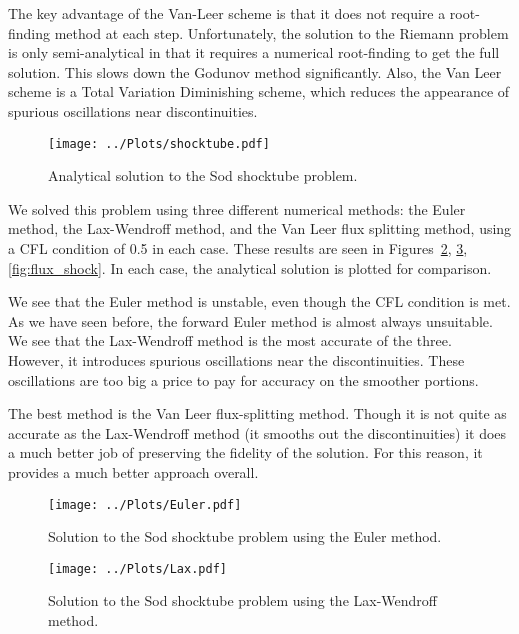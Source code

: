 \documentclass[twocolumn]{myarticle}
\begin{document}
The key advantage of the Van-Leer scheme is that it does not require a root-finding method at each step.
Unfortunately, the solution to the Riemann problem is only semi-analytical in that it requires a numerical root-finding to get the full solution.
This slows down the Godunov method significantly.
Also, the Van Leer scheme is a Total Variation Diminishing scheme, which reduces the appearance of spurious oscillations near discontinuities.

\begin{figure}[ht]
    \centering
    \texttt{[image: ../Plots/shocktube.pdf]}
    \caption{Analytical solution to the Sod shocktube problem.}
    \label{fig:shocktube}
\end{figure}

We solved this problem using three different numerical methods: the Euler method, the Lax-Wendroff method, and the Van Leer flux splitting method, using a CFL condition of 0.5 in each case.
These results are seen in Figures~\ref{fig:euler_shock}, \ref{fig:lax_shock}, \ref{fig:flux_shock}.
In each case, the analytical solution is plotted for comparison.

We see that the Euler method is unstable, even though the CFL condition is met.
As we have seen before, the forward Euler method is almost always unsuitable.
We see that the Lax-Wendroff method is the most accurate of the three.
However, it introduces spurious oscillations near the discontinuities.
These oscillations are too big a price to pay for accuracy on the smoother portions.

The best method is the Van Leer flux-splitting method.
Though it is not quite as accurate as the Lax-Wendroff method (it smooths out the discontinuities) it does a much better job of preserving the fidelity of the solution.
For this reason, it provides a much better approach overall.

\begin{figure}[ht]
    \centering
    \texttt{[image: ../Plots/Euler.pdf]}
    \caption{Solution to the Sod shocktube problem using the Euler method.}
    \label{fig:euler_shock}
\end{figure}

\begin{figure}[ht]
    \centering
    \texttt{[image: ../Plots/Lax.pdf]}
    \caption{Solution to the Sod shocktube problem using the Lax-Wendroff method.}
    \label{fig:lax_shock}
\end{figure}
\end{document}
